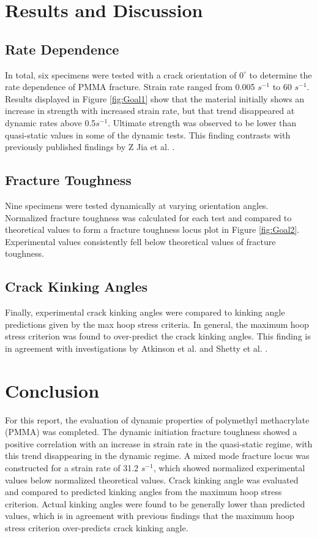 \documentclass[12pt]{article}
\begin{document}
\section{Results and Discussion} %
\subsection{Rate Dependence}
In total, six specimens were tested with a crack orientation of $0^{\circ}$ to determine the rate dependence of PMMA fracture. Strain rate ranged from 0.005 $s^{-1}$ to 60 $s^{-1}$. Results displayed in Figure \ref{fig:Goal1} show that the material initially shows an increase in strength with increased strain rate, but that trend disappeared at dynamic rates above 0.5$s^{-1}$. Ultimate strength was observed to be lower than quasi-static values in some of the dynamic tests. This finding contrasts with previously published findings by Z Jia et al. \cite{Jia}. 
\subsection{Fracture Toughness}
Nine specimens were tested dynamically at varying orientation angles. Normalized fracture toughness was calculated for each test and compared to theoretical values to form a fracture toughness locus plot in Figure \ref{fig:Goal2}. Experimental values consistently fell below theoretical values of fracture toughness. 
\subsection{Crack Kinking Angles}
Finally, experimental crack kinking angles were compared to kinking angle predictions given by the max hoop stress criteria. In general, the maximum hoop stress criterion was found to over-predict the crack kinking angles. This finding is in agreement with investigations by Atkinson et al. and Shetty et al. \cite{Atkinson} \cite{Shetty}.

\section{Conclusion} %
For this report, the evaluation of dynamic properties of polymethyl methacrylate (PMMA) was completed. The dynamic initiation fracture toughness showed a positive correlation with an increase in strain rate in the quasi-static regime, with this trend disappearing in the dynamic regime. A mixed mode fracture locus was constructed for a strain rate of 31.2 $s^{-1}$, which showed normalized experimental values below normalized theoretical values. Crack kinking angle was evaluated and compared to predicted kinking angles from the maximum hoop stress criterion. Actual kinking angles were found to be generally lower than predicted values, which is in agreement with previous findings that the maximum hoop stress criterion over-predicts crack kinking angle.
\end{document}
